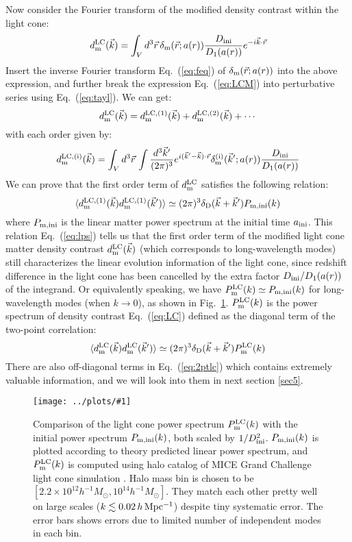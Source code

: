 \documentclass[prd,amsmath,amssymb,floatfix,superscriptaddress,nofootinbib,twocolumn]{revtex4-1}
\def\be{\begin{equation}}
\def\ee{\end{equation}}
\newcommand{\LC}{\rm LC}
\newcommand{\ini}{\rm ini}
\newcommand{\vrr}{\vec{r}}
\newcommand{\vk}{\vec{k}}
\newcommand{\ec}[1]{Eq.~(\ref{eq:#1})}
\newcommand{\eql}[1]{\label{eq:#1}}
\newcommand{\rf}[1]{\ref{fig:#1}}
\newcommand{\sfig}[2]{
\texttt{[image: ../plots/\#1]}
        }
\newcommand{\Sfig}[2]{
   \begin{figure}[thbp]
   \begin{center}
    \sfig{../plots/#1.pdf}{\columnwidth}
    \caption{{\small #2}}
    \label{fig:#1}
     \end{center}
   \end{figure}
}
\begin{document}
Now consider the Fourier transform of the modified density contrast within the light cone:
\be
d^{\LC}_{\rm m}(\vk) =\int_{V} d^3\vrr  \, \delta_{\rm m}(\vrr;a(r)) \frac{D_{\ini}}{D_{1}(a(r))}  e^{-i\vk \cdot\vrr} \eql{LCM}
\ee
Insert the inverse Fourier transform \ec{feq} of $\delta_{\rm m}(\vrr;a(r))$ into the above expression, and further break the expression \ec{LCM} into perturbative series using \ec{tayl}. We can get:
\be 
d^{\LC}_{\rm m}(\vk) = d^{\LC,(1)}_{\rm m}(\vk)+d^{\LC,(2)}_{\rm m}(\vk)+\cdots
\ee 
with each order given by:
\be 
d^{\LC,(\rm i)}_{\rm m}(\vk)=\int_{V} d^3\vrr  \, \int \frac{d^3 \vk'}{(2\pi)^3}e^{i(\vk'-\vk)\cdot\vrr}\delta^{(\rm i)}_{\rm m}(\vk';a(r))\frac{D_{\ini}}{D_{1}(a(r))}  \eql{exp}
\ee 
We can prove that the first order term of $d^{\LC}_{\rm m}$ satisfies the following relation:
\be 
\langle d^{\LC,(\rm 1)}_{\rm m}(\vk) d^{\LC,(\rm 1)}_{\rm m}(\vk') \rangle \simeq (2\pi)^3 \delta_{\rm D}(\vk+\vk')P_{\rm m,ini}(k)\eql{lps}
\ee 
where $P_{\rm m,ini}$ is the linear matter power spectrum at the initial time $a_{\rm ini}$. This relation \ec{lps} tells us that the first order term of the modified light cone matter density contrast $d_{\rm m}^{\LC}(\vk)$ (which corresponds to long-wavelength modes) still characterizes the linear evolution information of the light cone, since redshift difference in the light cone has been cancelled by the extra factor $D_{\ini}/D_{1}(a(r))$ of the integrand. Or equivalently speaking, we have $P_{\rm m}^{\rm LC}(k)\simeq P_{\rm m,ini}(k)$ for long-wavelength modes (when $k\rightarrow 0$), as shown in Fig.~\rf{psLC}. $P_{\rm m}^{\rm LC}(k)$ is the power spectrum of density contrast \ec{LC} defined as the diagonal term of the two-point correlation:
\be 
\langle d_{\rm m}^{\rm LC} (\vk)d_{\rm m}^{\rm LC}(\vk')\rangle \simeq (2\pi)^3 \delta_{\rm D}(\vk+\vk')P_{\rm m}^{\rm LC}(k) \eql{2ptlc}
\ee 
There are also off-diagonal terms in \ec{2ptlc} which contains extremely valuable information, and we will look into them in next section \ref{sec5}.

\Sfig{psLC}{Comparison of the light cone power spectrum $P_{\rm m}^{\LC}(k)$ with the initial power spectrum $P_{\rm m,ini}(k)$, both scaled by $1/D_{\ini}^{2}$. $P_{\rm m, ini}(k)$ is plotted according to theory predicted linear power spectrum, and $P_{\rm m}^{\LC}(k)$ is computed using halo catalog of MICE Grand Challenge light cone simulation \cite{Fosalba:2015MI}\cite{Fosalba:2015MII}. Halo mass bin is chosen to be $[2.2 \times 10^{12}h^{-1}M_{\odot},10^{14}h^{-1}M_{\odot}]$. They match each other pretty well on large scales ($k\lesssim 0.02 \,h\,\rm Mpc^{-1}$) despite tiny systematic error. The error bars shows errors due to limited number of independent modes in each bin.}
\end{document}

